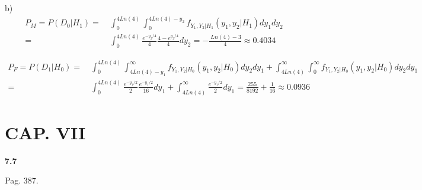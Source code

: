 b)
\begin{equation*}
\begin{split}
	P_M = P(D_0|H_1) = \ & \int_{0}^{4Ln(4)} \int_{0}^{4Ln(4) - y_2} f_{Y_1, Y_2 |H_1}(y_1, y_2|H_1) dy_1 dy_2 \\
	= \ & \int_{0}^{4Ln(4)}  \frac{e^{-y_2/4}}{4} \frac{4 - e^{y_2/4}}{4} dy_2 = -\frac{\ Ln(4) - 3}{4} \approx 0.4034
\end{split}
\end{equation*}

\begin{equation*}
\begin{split}
	P_F = P(D_1|H_0) = \ & \int_{0}^{4Ln(4)} \int_{4Ln(4) - y_1}^{\infty} f_{Y_1, Y_2 |H_0}(y_1, y_2|H_0) dy_2 dy_1 + \int_{4Ln(4)}^{\infty} \int_{0}^{\infty} f_{Y_1, Y_2 |H_0}(y_1, y_2|H_0) dy_2 dy_1 \\
	= \ & \int_{0}^{4Ln(4)} \frac{e^{-y_1/2}}{2} \frac{e^{-y_1/2}}{16} dy_1 + \int_{4Ln(4)}^{\infty} \frac{e^{-y_1/2}}{2} dy_1 = \frac{255}{8192} + \frac{1}{16} \approx 0.0936
\end{split}
\end{equation*}

\newpage

\section*{CAP. VII}

\textbf{7.7}

Pag. 387.

